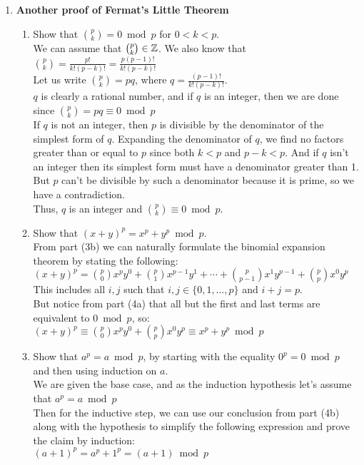 \documentclass[11pt,fleqn]{article}
\begin{document}
\begin{enumerate}
\newpage
\item \textbf{Another proof of Fermat's Little Theorem}
\begin{enumerate}
\item Show that $\binom {p}{k} = 0 \bmod{p}$ for $0 < k < p$. \\
We can assume that $\binom{p}{k} \in \mathbb{Z}$. We also know that $\binom{p}{k} = \frac{p!}{k!(p-k)!} = \frac{p(p-1)!}{k!(p-k)!}$ \\
Let us write $\binom{p}{k} = pq$, where $q = \frac{(p-1)!}{k!(p-k)!}$. \\
$q$ is clearly a rational number, and if $q$ is an integer, then we are done since $\binom{p}{k} = pq \equiv 0 \bmod p$ \\
If $q$ is not an integer, then $p$ is divisible by the denominator of the simplest form of $q$. Expanding the denominator of $q$, we find no factors greater than or equal to $p$ since both $k<p$ and $p-k<p$. And if $q$ isn't an integer then its simplest form must have a denominator greater than 1. But $p$ can't be divisible by such a denominator because it is prime, so we have a contradiction. \\
Thus, $q$ is an integer and $\binom{p}{k} \equiv 0 \bmod p$.
\item Show that $(x+y)^p = x^p + y^p \bmod{p}$. \\
From part (3b) we can naturally formulate the binomial expansion theorem by stating the following: \\
$\displaystyle (x+y)^p = \binom{p}{0}x^py^0 + \binom{p}{1}x^{p-1}y^1 + \cdots + \binom{p}{p-1}x^1y^{p-1} + \binom{p}{p}x^0y^p$ \\
This includes all $i,j$ such that $i,j \in \{0,1,\ldots,p\}$ and $i+j=p$. \\
But notice from part (4a) that all but the first and last terms are equivalent to $0 \bmod p$, so: \\
$\displaystyle (x+y)^p \equiv \binom{p}{0}x^py^0 + \binom{p}{p}x^0y^p \equiv x^p + y^p \bmod p$
\item Show that $a^p = a \bmod{p}$, by starting with the equality $0^p = 0 \bmod{p}$
and then using induction on $a$. \\
We are given the base case, and as the induction hypothesis let's assume that $a^p = a \bmod p$ \\
Then for the inductive step, we can use our conclusion from part (4b) along with the hypothesis to simplify the following expression and prove the claim by induction: \\
$(a+1)^p = a^p + 1^p = (a+1) \bmod p$
\end{enumerate}


\end{enumerate}
\end{document}
